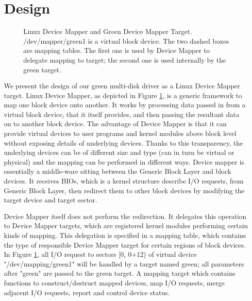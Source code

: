 \section{Design}
\label{Design}

\begin{figure}[ht]
\begin{centering}
\caption{Linux Device Mapper and Green Device Mapper Target.
/dev/mapper/green1 is a virtual block device. The two dashed boxes are
mapping tables. The first one is used by Device Mapper to delegate
mapping to target; the second one is used internally by the green
target.}
\label{fig:dm}
\end{centering}
\end{figure}

We present the design of our green multi-disk driver as a Linux Device
Mapper target. Linux Device Mapper, as depicted in Figure
\ref{fig:dm}, is a generic framework to map one block device onto
another. It works by processing data passed in from a virtual block
device, that it itself provides, and then passing the resultant data
on to another block device. The advantage of Device Mapper is that it
can provide virtual devices to user programs and kernel modules above
block level without exposing details of underlying devices. Thanks to
this transparency, the underlying devices can be of different size and
type (can in turn be virtual or physical) and the mapping can be
performed in different ways. Device mapper is essentially a
middle-ware sitting between the Generic Block Layer and block devices.
It receives BIOs, which is a kernel structure describe I/O requests,
from Generic Block Layer, then redirect them to other block devices by
modifying the target device and target sector. 

Device Mapper itself does not perform the redirection. It delegates
this operation to Device Mapper targets, which are registered kernel
modules performing certain kinds of mapping. This delegation is
specified in a mapping table, which contains the type of responsible
Device Mapper target for certain regions of block devices. In Figure
\ref{fig:dm}, all I/O request to sectors [0, 0+12) of virtual device
"/dev/mapping/green1" will be handled by a target named green; all
parameters after "green" are passed to the green target. A mapping
target which contains functions to construct/destruct mapped devices,
map I/O requests, merge adjacent I/O requests, report and control
device status.

